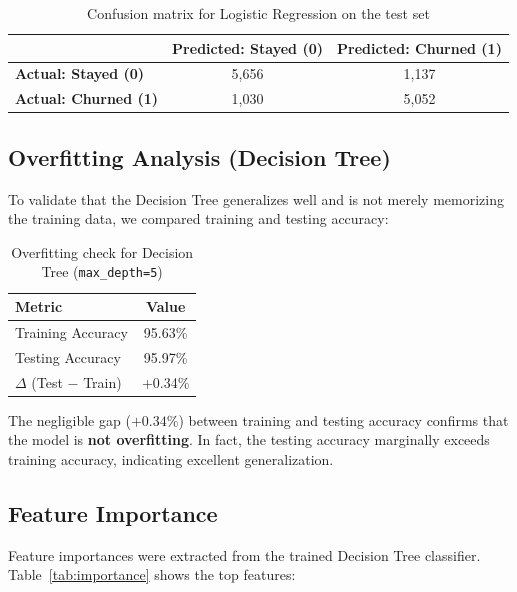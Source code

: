 \documentclass[12pt, a4paper]{article}
\begin{document}
\begin{table}[H]
\centering
\caption{Confusion matrix for Logistic Regression on the test set}
\label{tab:confusion}
\begin{tabular}{@{} l c c @{}}
\toprule
 & \textbf{Predicted: Stayed (0)} & \textbf{Predicted: Churned (1)} \\
\midrule
\textbf{Actual: Stayed (0)}   & 5,656 & 1,137 \\
\textbf{Actual: Churned (1)}  & 1,030 & 5,052 \\
\bottomrule
\end{tabular}
\end{table}

\subsection{Overfitting Analysis (Decision Tree)}

To validate that the Decision Tree generalizes well and is not merely memorizing the training data, we compared training and testing accuracy:

\begin{table}[H]
\centering
\caption{Overfitting check for Decision Tree (\texttt{max\_depth=5})}
\label{tab:overfit}
\begin{tabular}{@{} l c @{}}
\toprule
\textbf{Metric} & \textbf{Value} \\
\midrule
Training Accuracy & 95.63\% \\
Testing Accuracy  & 95.97\% \\
$\Delta$ (Test $-$ Train) & +0.34\% \\
\bottomrule
\end{tabular}
\end{table}

The negligible gap ($+0.34\%$) between training and testing accuracy confirms that the model is \textbf{not overfitting}. In fact, the testing accuracy marginally exceeds training accuracy, indicating excellent generalization.

\subsection{Feature Importance}

Feature importances were extracted from the trained Decision Tree classifier. Table~\ref{tab:importance} shows the top features:
\end{document}
